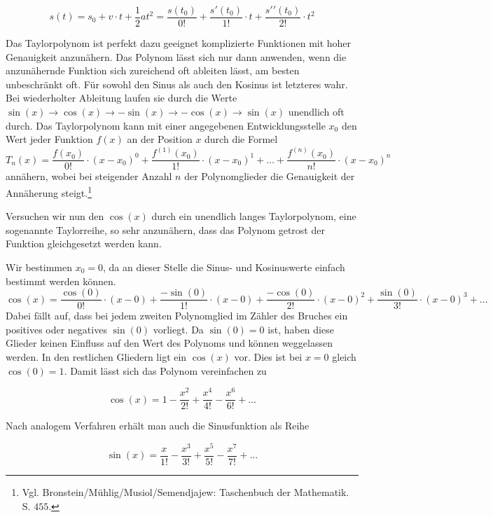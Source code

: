 \documentclass[a4paper,12pt]{article} %
\begin{document}
\[s(t)=s_0+v\cdot t + \frac{1}{2}at^2=\frac{s(t_0)}{0!}+\frac{s\prime(t_0)}{1!}\cdot t +\frac{s\prime\prime(t_0)}{2!} \cdot t^2\]


Das Taylorpolynom ist perfekt dazu geeignet komplizierte Funktionen mit hoher Genauigkeit anzunähern.
Das Polynom lässt sich nur dann anwenden, wenn die anzunähernde Funktion sich zureichend oft ableiten lässt, am besten unbeschränkt oft.
Für sowohl den Sinus als auch den Kosinus ist letzteres wahr.
Bei wiederholter Ableitung laufen sie durch die Werte $\sin(x) \rightarrow \cos(x) \rightarrow -\sin(x) \rightarrow -\cos(x) \rightarrow \sin(x)$ unendlich oft durch.
Das Taylorpolynom kann mit einer angegebenen Entwicklungsstelle $x_0$ den Wert jeder Funktion $f(x)$ an der Position $x$ durch die Formel
\begin{equation}
	T_n(x)=\frac{f(x_0)}{0!}\cdot(x-x_0)^0 + \frac{f^{(1)}(x_0)}{1!}\cdot(x-x_0)^1 +%
	\dots +\frac{f^{(n)}(x_0)}{n!}\cdot(x-x_0)^n
\end{equation} %
annähern, wobei bei steigender Anzahl $n$ der Polynomglieder die Genauigkeit der Annäherung steigt.\footnote{Vgl. Bronstein/Mühlig/Musiol/Semendjajew: Taschenbuch der Mathematik. S. $455$.}


Versuchen wir nun den $\cos(x)$ durch ein unendlich langes Taylorpolynom, eine sogenannte Taylorreihe, so sehr anzunähern, dass das Polynom getrost der Funktion gleichgesetzt werden kann.


Wir bestimmen $x_0=0$, da an dieser Stelle die Sinus- und Kosinuswerte einfach bestimmt werden können.
\[\cos(x)=\frac{\cos(0)}{0!}\cdot(x-0) + \frac{-\sin(0)}{1!}\cdot(x-0) + \frac{-\cos(0)}{2!}\cdot(x-0)^2+\frac{\sin(0)}{3!}\cdot(x-0)^3+\dots\]
Dabei fällt auf, dass bei jedem zweiten Polynomglied im Zähler des Bruches ein positives oder negatives $\sin(0)$ vorliegt.
Da $\sin(0)=0$ ist, haben diese Glieder keinen Einfluss auf den Wert des Polynoms und können weggelassen werden. In den restlichen Gliedern ligt ein $\cos(x)$ vor. Dies ist bei $x=0$ gleich $\cos(0)=1$. Damit lässt sich das Polynom vereinfachen zu

\begin{equation}\label{cos}
	\cos(x)=1-\frac{x^2}{2!}+\frac{x^4}{4!}-\frac{x^6}{6!}+\dots
\end{equation}

Nach analogem Verfahren erhält man auch die Sinusfunktion als Reihe

\begin{equation}\label{sin}
	\sin(x)=\frac{x}{1!}-\frac{x^3}{3!}+\frac{x^5}{5!}-\frac{x^7}{7!}+\dots
\end{equation}
\end{document}
